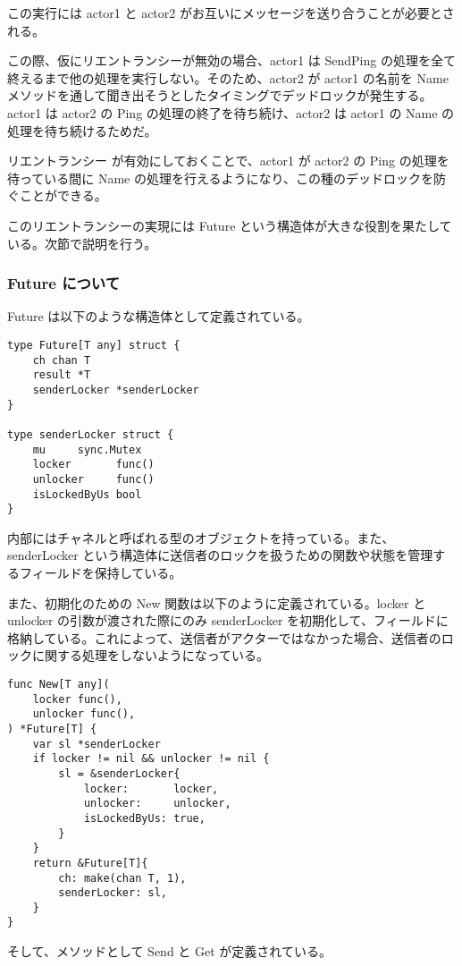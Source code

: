 この実行には actor1 と actor2
がお互いにメッセージを送り合うことが必要とされる。

この際、仮にリエントランシーが無効の場合、actor1 は SendPing
の処理を全て終えるまで他の処理を実行しない。そのため、actor2 が actor1
の名前を Name
メソッドを通して聞き出そうとしたタイミングでデッドロックが発生する。actor1
は actor2 の Ping の処理の終了を待ち続け、actor2 は actor1 の Name
の処理を待ち続けるためだ。

リエントランシー が有効にしておくことで、actor1 が actor2 の Ping
の処理を待っている間に Name
の処理を行えるようになり、この種のデッドロックを防ぐことができる。

このリエントランシーの実現には Future
という構造体が大きな役割を果たしている。次節で説明を行う。

\subsubsection{Future について}

Future は以下のような構造体として定義されている。

\begin{verbatim}
type Future[T any] struct {
    ch chan T
    result *T
    senderLocker *senderLocker
}

type senderLocker struct {
    mu     sync.Mutex
    locker       func()
    unlocker     func()
    isLockedByUs bool
}
\end{verbatim}

内部にはチャネルと呼ばれる型のオブジェクトを持っている。また、senderLocker
という構造体に送信者のロックを扱うための関数や状態を管理するフィールドを保持している。

また、初期化のための New 関数は以下のように定義されている。locker と
unlocker の引数が渡された際にのみ senderLocker
を初期化して、フィールドに格納している。これによって、送信者がアクターではなかった場合、送信者のロックに関する処理をしないようになっている。

\begin{verbatim}
func New[T any](
    locker func(),
    unlocker func(),
) *Future[T] {
    var sl *senderLocker
    if locker != nil && unlocker != nil {
        sl = &senderLocker{
            locker:       locker,
            unlocker:     unlocker,
            isLockedByUs: true,
        }
    }
    return &Future[T]{
        ch: make(chan T, 1),
        senderLocker: sl,
    }
}
\end{verbatim}

そして、メソッドとして Send と Get が定義されている。

